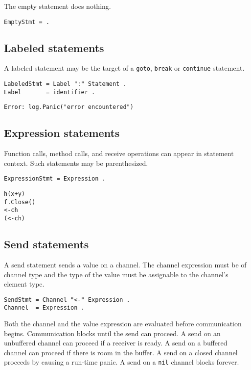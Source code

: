 The empty statement does nothing.

\begin{Verbatim}[frame=single]
EmptyStmt = .
\end{Verbatim}

\subsection*{Labeled statements}

A labeled statement may be the target of a \texttt{goto}, \texttt{break}
or \texttt{continue} statement.

\begin{Verbatim}[frame=single]
LabeledStmt = Label ":" Statement .
Label       = identifier .
\end{Verbatim}

\begin{Verbatim}[frame=single]
Error: log.Panic("error encountered")
\end{Verbatim}

\subsection*{Expression statements}

Function calls, method calls, and receive operations can appear in
statement context. Such statements may be parenthesized.

\begin{Verbatim}[frame=single]
ExpressionStmt = Expression .
\end{Verbatim}

\begin{Verbatim}[frame=single]
h(x+y)
f.Close()
<-ch
(<-ch)
\end{Verbatim}

\subsection*{Send statements}

A send statement sends a value on a channel. The channel expression must
be of channel type and the type of the value
must be assignable to the channel's element
type.

\begin{Verbatim}[frame=single]
SendStmt = Channel "<-" Expression .
Channel  = Expression .
\end{Verbatim}

Both the channel and the value expression are evaluated before
communication begins. Communication blocks until the send can
proceed. A send on an unbuffered channel can proceed if a receiver
is ready. A send on a buffered channel can proceed if there is room
in the buffer. A send on a closed channel proceeds by causing a
run-time panic. A send on a \texttt{nil} channel blocks forever.

